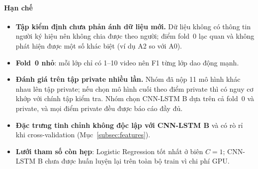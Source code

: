 \paragraph*{Hạn chế}
\begin{itemize}
  \item \textbf{Tập kiểm định chưa phản ánh dữ liệu mới.} Dữ liệu không có thông tin người ký hiệu nên không chia được theo người; điểm fold~0 lạc quan và không phát hiện được một số khác biệt (ví dụ A2 so với A0).
  \item \textbf{Fold~0 nhỏ}: mỗi lớp chỉ có 1--10 video nên F1 từng lớp dao động mạnh.
  \item \textbf{Đánh giá trên tập private nhiều lần.} Nhóm đã nộp 11 mô hình khác nhau lên tập private; nếu chọn mô hình cuối theo điểm private thì có nguy cơ khớp với chính tập kiểm tra. Nhóm chọn CNN-LSTM B dựa trên cả fold~0 và private, và mọi điểm private đều được báo cáo đầy đủ.
  \item \textbf{Đặc trưng tinh chỉnh không độc lập với CNN-LSTM B} và có rò rỉ khi cross-validation (Mục~\ref{subsec:features}).
  \item \textbf{Lưới tham số còn hẹp}: Logistic Regression tốt nhất ở biên $C=1$; CNN-LSTM B chưa được huấn luyện lại trên toàn bộ train vì chi phí GPU.
\end{itemize}
